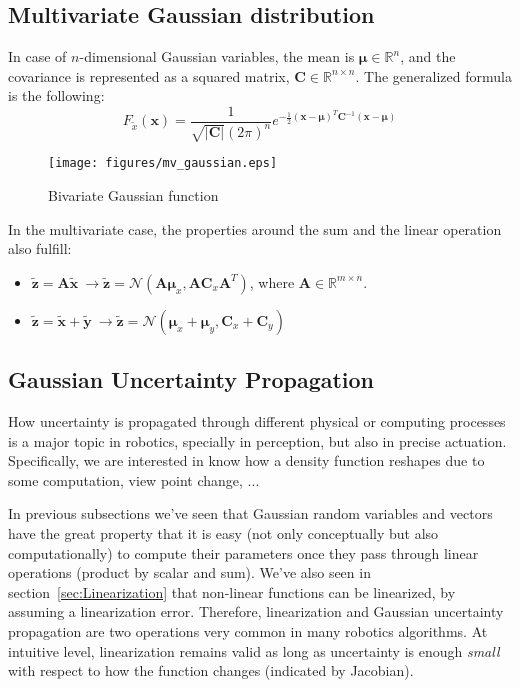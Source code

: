 \subsection{Multivariate Gaussian distribution}
\label{subsec:mulivariate_gaussian_distribution}
In case of $n$-dimensional Gaussian variables, the mean is $\boldsymbol{\mu} \in \mathbb{R}^n$, and the covariance is represented as a squared matrix, $\mathbf{C}\in\mathbb{R}^{n\times n}$. The generalized formula is the following: 
\begin{equation}
 F_{\tilde{x}}(\mathbf{x}) = \frac{1}{\sqrt{\vert \mathbf{C}\vert}(2\pi)^n}
			    e^{-\frac{1}{2}(\mathbf{x}-\boldsymbol\mu)^T\mathbf{C}^{-1}(\mathbf{x}-\boldsymbol\mu)}
\end{equation}
\begin{figure}[bth!]
  \begin{center}
    \texttt{[image: figures/mv\_gaussian.eps]}
    \caption{Bivariate Gaussian function}
    \label{fig:mv_gaussian}
  \end{center}
\end{figure}

In the multivariate case, the properties around the sum and the linear operation also fulfill: 
\begin{itemize}
 \item $\tilde{\mathbf{z}}=\mathbf{A}\tilde{\mathbf{x}} \ 
      \rightarrow \tilde{\mathbf{z}}=\mathcal{N}(\mathbf{A}\boldsymbol\mu_x,\mathbf{A}\mathbf{C}_x\mathbf{A}^T)$, 
      where $\mathbf{A}\in \mathbb{R}^{m \times n}$.
 \item $\tilde{\mathbf{z}}=\tilde{\mathbf{x}}+\tilde{\mathbf{y}} \ 
      \rightarrow \tilde{\mathbf{z}}=\mathcal{N}(\boldsymbol\mu_x+\boldsymbol\mu_y,\mathbf{C}_x+\mathbf{C}_y)$
\end{itemize}


\subsection{Gaussian Uncertainty Propagation}
How uncertainty is propagated through different physical or computing processes is a major topic in robotics, specially in perception, but also in precise actuation. Specifically, we are interested in know how a density function reshapes due to some computation, view point change, ...

In previous subsections we've seen that Gaussian random variables and vectors have the great property that it is easy (not only conceptually but also computationally) to compute their parameters once they pass through linear operations (product by scalar and sum). We've also seen in section~\ref{sec:Linearization} that non-linear functions can be linearized, by assuming a linearization error. Therefore, linearization and Gaussian uncertainty propagation are two operations very common in many robotics algorithms. At intuitive level, linearization remains valid as long as uncertainty is enough \textit{small} with respect to how the function changes (indicated by Jacobian). 

